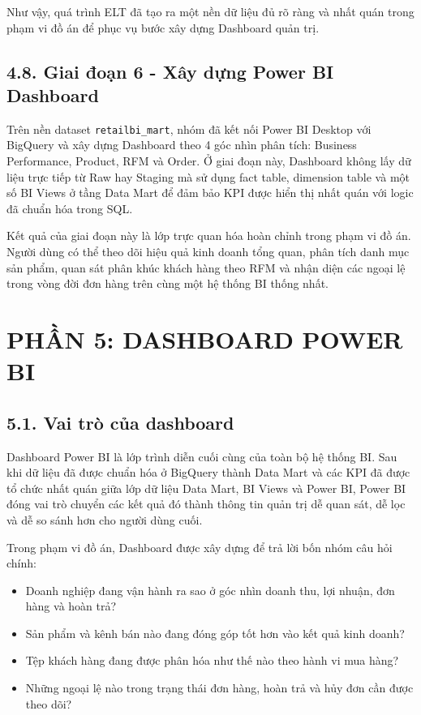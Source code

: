 \documentclass[12pt,a4paper]{article}
\newcommand{\code}[1]{\texttt{#1}}
\begin{document}
Như vậy, quá trình ELT đã tạo ra một nền dữ liệu đủ rõ ràng và nhất quán trong phạm vi đồ án để phục vụ bước xây dựng Dashboard quản trị.

\subsection{4.8. Giai đoạn 6 - Xây dựng Power BI Dashboard}

Trên nền dataset \code{retailbi\_mart}, nhóm đã kết nối Power BI Desktop với BigQuery và xây dựng Dashboard theo 4 góc nhìn phân tích: Business Performance, Product, RFM và Order. Ở giai đoạn này, Dashboard không lấy dữ liệu trực tiếp từ Raw hay Staging mà sử dụng fact table, dimension table và một số BI Views ở tầng Data Mart để đảm bảo KPI được hiển thị nhất quán với logic đã chuẩn hóa trong SQL.

Kết quả của giai đoạn này là lớp trực quan hóa hoàn chỉnh trong phạm vi đồ án. Người dùng có thể theo dõi hiệu quả kinh doanh tổng quan, phân tích danh mục sản phẩm, quan sát phân khúc khách hàng theo RFM và nhận diện các ngoại lệ trong vòng đời đơn hàng trên cùng một hệ thống BI thống nhất.

\section{PHẦN 5: DASHBOARD POWER BI}

\subsection{5.1. Vai trò của dashboard}

Dashboard Power BI là lớp trình diễn cuối cùng của toàn bộ hệ thống BI. Sau khi dữ liệu đã được chuẩn hóa ở BigQuery thành Data Mart và các KPI đã được tổ chức nhất quán giữa lớp dữ liệu Data Mart, BI Views và Power BI, Power BI đóng vai trò chuyển các kết quả đó thành thông tin quản trị dễ quan sát, dễ lọc và dễ so sánh hơn cho người dùng cuối.

Trong phạm vi đồ án, Dashboard được xây dựng để trả lời bốn nhóm câu hỏi chính:

\begin{itemize}
    \item Doanh nghiệp đang vận hành ra sao ở góc nhìn doanh thu, lợi nhuận, đơn hàng và hoàn trả?
    \item Sản phẩm và kênh bán nào đang đóng góp tốt hơn vào kết quả kinh doanh?
    \item Tệp khách hàng đang được phân hóa như thế nào theo hành vi mua hàng?
    \item Những ngoại lệ nào trong trạng thái đơn hàng, hoàn trả và hủy đơn cần được theo dõi?
\end{itemize}
\end{document}
